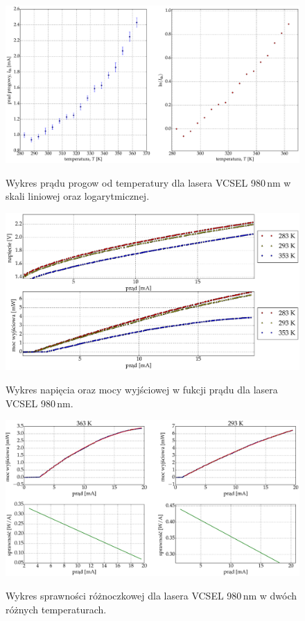 \begin{figure}
\center
  \includegraphics[scale=0.30]{plot980/plot_temp_i_th_log_lin.eps}
  \label{rys1}
  \caption{Wykres prądu progow od temperatury dla lasera VCSEL 980\,nm w skali liniowej oraz logarytmicznej.}
\end{figure}
\begin{figure}
\center
  \includegraphics[scale=0.30]{plot980/plot_i_v_i_l.eps}
  \label{rys1}
  \caption{Wykres napięcia oraz mocy wyjściowej w fukcji prądu dla lasera VCSEL 980\,nm.}
\end{figure}
\begin{figure}
\center
  \includegraphics[scale=0.30]{plot980/plot_eff_via_current4.eps}
  \label{rys1}
  \caption{Wykres sprawności różnoczkowej dla lasera VCSEL 980\,nm w dwóch różnych temperaturach.}
\end{figure}
